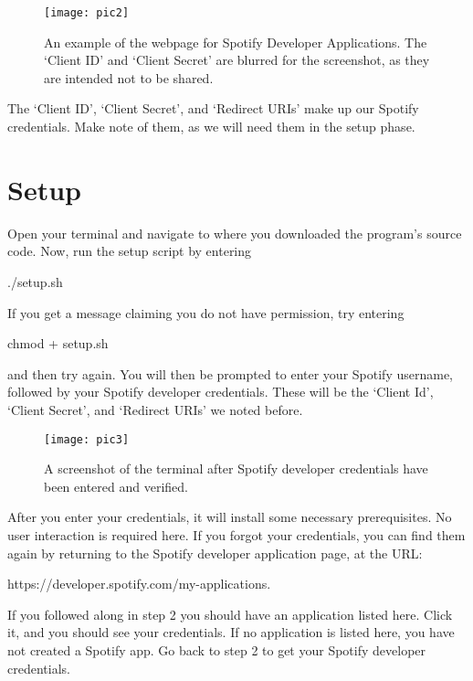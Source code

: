 \documentclass{roffin}
\begin{document}
\begin{figure}[!h]
    \centering
    \texttt{[image: pic2]}
    \caption{An example of the webpage for Spotify Developer Applications. The `Client ID' and `Client Secret' are blurred for the screenshot, as they are intended not to be shared.}
    \label{fig:fig2}
\end{figure}

The `Client ID', `Client Secret', and `Redirect URIs' make up our Spotify credentials. Make note of them, as we will need them in the setup phase.


\section{Setup} 

Open your terminal and navigate to where you downloaded the program's source code. Now, run the setup script by entering
\newline

\hspace{1cm} ./setup.sh

\hfill
\newline
If you get a message claiming you do not have permission, try entering
\newline

\hspace{1cm} chmod + setup.sh

\hfill
\newline
 and then try again. You will then be prompted to enter your Spotify username, followed by your Spotify developer credentials. These will be the `Client Id', `Client Secret', and `Redirect URIs' we noted before.
 
\begin{figure}[!h]
    \centering
    \texttt{[image: pic3]}
    \caption{A screenshot of the terminal after Spotify developer credentials have been entered and verified.}
    \label{fig:fig3}
\end{figure}
 
 After you enter your credentials, it will install some necessary prerequisites. No user interaction is required here. If you forgot your credentials, you can find them again by returning to the Spotify developer application page, at the URL: 
\newline

\hspace{1cm} https://developer.spotify.com/my-applications.

\hfill
\newline
If you followed along in step 2 you should have an application listed here. Click it, and you should see your credentials. If no application is listed here, you have not created a Spotify app. Go back to step 2 to get your Spotify developer credentials.
\end{document}
